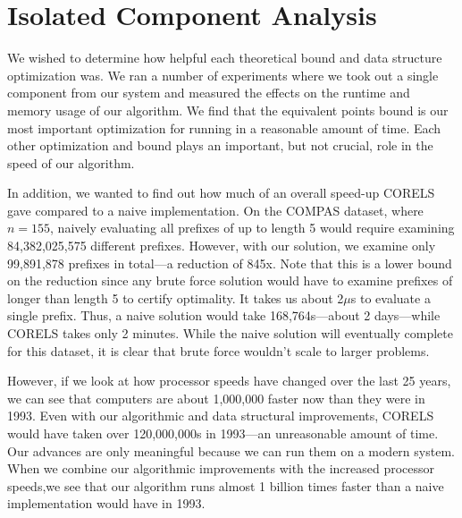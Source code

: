 \section{Isolated Component Analysis}
We wished to determine how helpful each theoretical bound and data structure optimization was.
We ran a number of experiments where we took out a single component from our system and measured the effects on the runtime and memory usage of our algorithm.
We find that the equivalent points bound is our most important optimization for running in a reasonable amount of time.
Each other optimization and bound plays an important, but not crucial, role in the speed of our algorithm.

In addition, we wanted to find out how much of an overall speed-up CORELS gave compared to a naive implementation.
On the COMPAS dataset, where $n = 155$, naively evaluating all prefixes of up to length 5 would require examining 84,382,025,575 different prefixes.
However, with our solution, we examine only 99,891,878 prefixes in total---a reduction of 845x.
Note that this is a lower bound on the reduction since any brute force solution would have to examine prefixes of longer than length 5 to certify optimality.
It takes us about 2$\mu$s to evaluate a single prefix.
Thus, a naive solution would take 168,764s---about 2 days---while CORELS takes only 2 minutes.
While the naive solution will eventually complete for this dataset, it is clear that brute force wouldn't scale to larger problems.

However, if we look at how processor speeds have changed over the last 25 years, we can see that computers are about 1,000,000 faster now than they were in 1993. \cite{Supercomputer}
Even with our algorithmic and data structural improvements, CORELS would have taken over 120,000,000s in 1993---an unreasonable amount of time.
Our advances are only meaningful because we can run them on a modern system.
When we combine our algorithmic improvements with the increased processor speeds,we see that our algorithm runs almost 1 billion times faster than a naive implementation would have in 1993.

